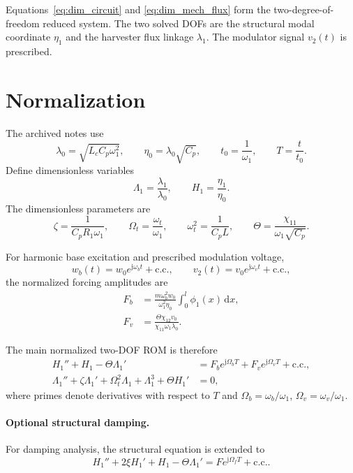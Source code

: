 \documentclass[11pt]{article}
\newcommand{\dd}{\mathrm{d}}
\newcommand{\jj}{\mathrm{j}}
\newcommand{\cc}{\mathrm{c.c.}}
\begin{document}
Equations~\eqref{eq:dim_circuit} and \eqref{eq:dim_mech_flux} form the
two-degree-of-freedom reduced system.  The two solved DOFs are the structural
modal coordinate $\eta_1$ and the harvester flux linkage $\lambda_1$.  The
modulator signal $v_2(t)$ is prescribed.

\section{Normalization}

The archived notes use
\begin{equation}
  \lambda_0=\sqrt{L_cC_p\omega_1^2},\qquad
  \eta_0=\lambda_0\sqrt{C_p},\qquad
  t_0=\frac{1}{\omega_1},\qquad
  T=\frac{t}{t_0}.
\end{equation}
Define dimensionless variables
\begin{equation}
  \Lambda_1=\frac{\lambda_1}{\lambda_0},
  \qquad
  H_1=\frac{\eta_1}{\eta_0}.
\end{equation}
The dimensionless parameters are
\begin{equation}
  \zeta=\frac{1}{C_pR_1\omega_1},\qquad
  \Omega_t=\frac{\omega_t}{\omega_1},\qquad
  \omega_t^2=\frac{1}{C_pL},\qquad
  \Theta=\frac{\chi_{11}}{\omega_1\sqrt{C_p}}.
\end{equation}

For harmonic base excitation and prescribed modulation voltage,
\begin{equation}
  w_b(t)=w_0 e^{\jj\omega_b t}+\cc,
  \qquad
  v_2(t)=v_0 e^{\jj\omega_v t}+\cc,
\end{equation}
the normalized forcing amplitudes are
\begin{align}
  F_b
  &=
  \frac{m\omega_b^2w_0}{\omega_1^2\eta_0}
  \int_0^l\phi_1(x)\,\dd x,\\
  F_v
  &=
  \frac{\Theta\chi_{12}v_0}{\chi_{11}\omega_1\lambda_0}.
\end{align}

The main normalized two-DOF ROM is therefore
\begin{align}
  H_1''+H_1-\Theta\Lambda_1'
  &=
  F_b e^{\jj\Omega_bT}+F_v e^{\jj\Omega_vT}+\cc,
  \label{eq:nondim_mech}\\
  \Lambda_1''
  +\zeta\Lambda_1'
  +\Omega_t^2\Lambda_1
  +\Lambda_1^3
  +\Theta H_1'
  &=0,
  \label{eq:nondim_circuit}
\end{align}
where primes denote derivatives with respect to $T$ and
$\Omega_b=\omega_b/\omega_1$, $\Omega_v=\omega_v/\omega_1$.

\paragraph{Optional structural damping.}
For damping analysis, the structural equation is extended to
\begin{equation}
  H_1''+2\xi H_1'+H_1-\Theta\Lambda_1'
  =
  F e^{\jj\Omega_fT}+\cc.
  \label{eq:damped_mech}
\end{equation}
\end{document}
